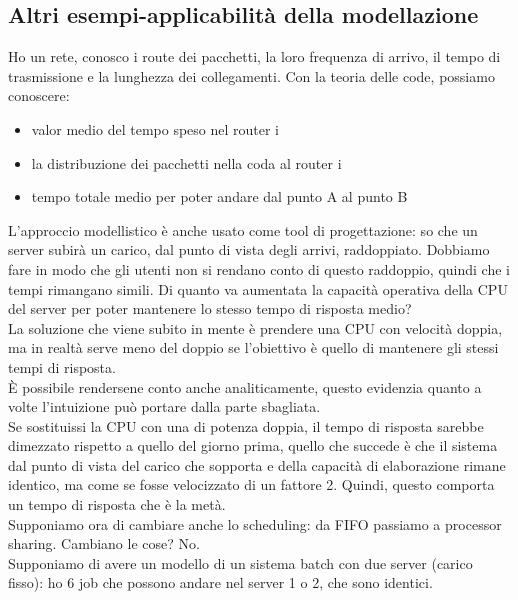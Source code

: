 \documentclass{article}
\begin{document}
\subsection{Altri esempi-applicabilità della modellazione}
Ho un rete, conosco i route dei pacchetti, la loro frequenza di arrivo, il tempo di trasmissione e la lunghezza dei collegamenti. Con la teoria delle code, possiamo conoscere:
\begin{itemize}
\item valor medio del tempo speso nel router i
\item la distribuzione dei pacchetti nella coda al router i
\item tempo totale medio per poter andare dal punto A al punto B
\end{itemize}
L'approccio modellistico è anche usato come tool di progettazione: so che un server subirà un carico, dal punto di vista degli arrivi, raddoppiato. Dobbiamo fare in modo che gli utenti non si rendano conto di questo raddoppio, quindi che i tempi rimangano simili. Di quanto va aumentata la capacità operativa della CPU del server per poter mantenere lo stesso tempo di risposta medio?\\ La soluzione che viene subito in mente è prendere una CPU con velocità doppia, ma in realtà serve meno del doppio se l'obiettivo è quello di mantenere gli stessi tempi di risposta.\\ È possibile rendersene conto anche analiticamente, questo evidenzia quanto a volte l'intuizione può portare dalla parte sbagliata.\\ Se sostituissi la CPU con una di potenza doppia, il tempo di risposta sarebbe dimezzato rispetto a quello del giorno prima, quello che succede è che il sistema dal punto di vista del carico che sopporta e della capacità di elaborazione rimane identico, ma come se fosse velocizzato di un fattore 2. Quindi, questo comporta un tempo di risposta che è la metà.\\ Supponiamo ora di cambiare anche lo scheduling: da FIFO passiamo a processor sharing. Cambiano le cose? No.\\ Supponiamo di avere un modello di un sistema batch con due server (carico fisso): ho 6 job che possono andare nel server 1 o 2, che sono identici.\\ 
\end{document}
